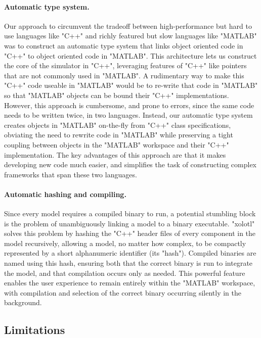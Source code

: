 \documentclass{frontiersSCNS} %
\begin{document}
\paragraph{Automatic type system.}
Our approach to circumvent the tradeoff between high-performance but hard to use languages like "C++" and richly featured but slow languages like "MATLAB" was to construct an automatic type system that links object oriented code in "C++" to object oriented code in "MATLAB". This architecture lets us construct the core of the simulator in "C++", leveraging features of "C++" like pointers that are not commonly used in "MATLAB". A rudimentary way to make this "C++" code useable in "MATLAB" would be to re-write that code in "MATLAB" so that "MATLAB" objects can be bound their "C++" implementations. However, this approach is cumbersome, and prone to errors, since the same code needs to be written twice, in two languages. Instead, our automatic type system creates objects in "MATLAB" on-the-fly  from "C++" class specifications, obviating the need to rewrite code in "MATLAB" while preserving a tight coupling between objects in the "MATLAB" workspace and their "C++" implementation. The key advantages of this approach are that it makes developing new code much easier, and simplifies the task of constructing complex frameworks that span these two languages. 

\paragraph{Automatic hashing and compiling.}
Since every model requires a compiled binary to run, a potential stumbling block is the problem of unambiguously linking a model to a binary executable. "xolotl" solves this problem by hashing the "C++" header files of every component in the model recursively, allowing a model, no matter how complex, to be compactly represented by a short alphanumeric identifier (its "hash"). Compiled binaries are named using this hash, ensuring both that the correct binary is run to integrate the model, and that compilation occurs only as needed. This powerful feature enables the user experience to remain entirely within the "MATLAB" workspace, with compilation and selection of the correct binary occurring silently in the background. 


\subsection{Limitations}
\label{limitations}
\end{document}
